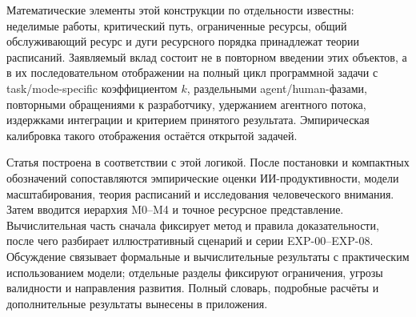 Математические элементы этой конструкции по отдельности известны: неделимые
работы, критический путь, ограниченные ресурсы, общий обслуживающий ресурс и
дуги ресурсного порядка принадлежат теории расписаний. Заявляемый вклад состоит
не в повторном введении этих объектов, а в их последовательном отображении на
полный цикл программной задачи с task/mode-specific коэффициентом $k$,
раздельными agent/human-фазами, повторными обращениями к разработчику,
удержанием агентного потока, издержками интеграции и критерием принятого
результата. Эмпирическая калибровка такого отображения остаётся открытой
задачей.

Статья построена в соответствии с этой логикой. После постановки и компактных
обозначений сопоставляются эмпирические оценки ИИ-продуктивности, модели
масштабирования, теория расписаний и исследования человеческого внимания.
Затем вводится иерархия M0--M4 и точное ресурсное представление. Вычислительная
часть сначала фиксирует метод и правила доказательности, после чего разбирает
иллюстративный сценарий и серии EXP-00--EXP-08. Обсуждение связывает формальные
и вычислительные результаты с практическим использованием модели; отдельные
разделы фиксируют ограничения, угрозы валидности и направления развития.
Полный словарь, подробные расчёты и дополнительные результаты вынесены в
приложения.
